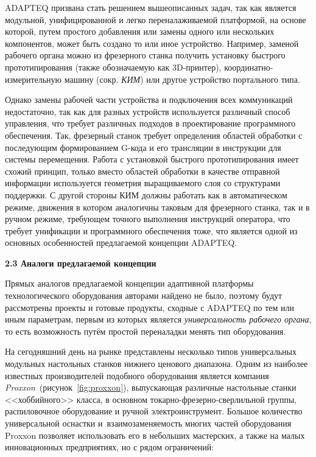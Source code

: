 ADAPTEQ призвана стать решением вышеописанных задач, так как является модульной, унифицированной и легко переналаживаемой платформой, на основе которой, путем простого добавления или замены одного или нескольких компонентов, может быть создано то или иное устройство. Например, заменой рабочего органа можно из фрезерного станка получить установку быстрого прототипирования (также обозначаемую как 3D-принтер), координатно-измерительную машину (сокр. \textit{КИМ}) или другое устройство портального типа.

Однако замены рабочей части устройства и подключения всех коммуникаций недостаточно, так как для разных устройств используется различный способ управления, что требует различных подходов в проектирование программного обеспечения. Так, фрезерный станок требует определения областей обработки с последующим формированием G-кода и его трансляции в инструкции для системы перемещения. Работа с установкой быстрого прототипирования имеет схожий принцип, только вместо областей обработки в качестве отправной информации используется геометрия выращиваемого слоя со структурами поддержки. С другой стороны КИМ должны работать как в автоматическом режиме, движения в котором аналогичны таковым для фрезерного станка, так и в ручном режиме, требующем точного выполнения инструкций оператора, что требует унификации и программного обеспечения тоже, что является одной из основных особенностей предлагаемой концепции ADAPTEQ.

\textbf{2.3 Аналоги предлагаемой концепции}

Прямых аналогов предлагаемой концепции адаптивной платформы технологического оборудования авторами найдено не было, поэтому будут рассмотрены проекты и готовые продукты, сходные с ADAPTEQ по тем или иным параметрам, первым из которых является \textit{универсальность рабочего органа}, то есть возможность путём простой переналадки менять тип оборудования. 

На сегодняшний день на рынке представлены несколько типов универсальных модульных настольных станков нижнего ценового диапазона. Одним из наиболее известных производителей подобного оборудования является компания \textit{Proxxon}~(рисунок~\cref{fig:proxxon}), выпускающая различные настольные станки <<хоббийного>> класса, в основном токарно-фрезерно-сверлильной группы, распиловочное оборудование и ручной электроинструмент. Большое количество универсальной оснастки и~взаимозаменяемость многих частей оборудования Proxxon позволяет использовать его в небольших мастерских, а также на малых инновационных предприятиях, но с рядом ограничений:

